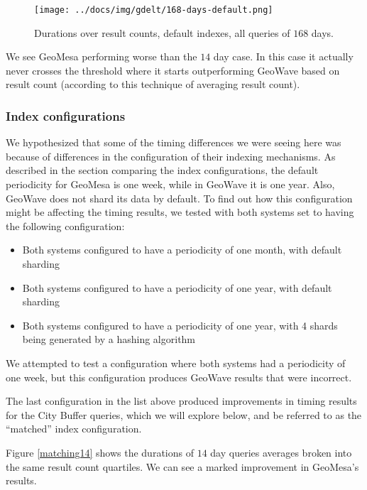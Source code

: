 \begin{figure}[h!tb]
  \centering
  \texttt{[image: ../docs/img/gdelt/168-days-default.png]}
  \caption{Durations over result counts, default indexes, all queries of $168$ days.}
  \label{durationresultall168}
\end{figure}

We see GeoMesa performing worse than the $14$ day case.
In this case it actually never crosses the threshold where it starts outperforming GeoWave based on result count
(according to this technique of averaging result count).

\subsubsection{Index configurations}

We hypothesized that some of the timing differences we were seeing here was because of differences in the configuration
of their indexing mechanisms. As described in the section comparing the index configurations, the default periodicity
for GeoMesa is one week, while in GeoWave it is one year. Also, GeoWave does not shard its data by default.
To find out how this configuration might be affecting the timing results, we tested with both systems set
to having the following configuration:

\begin{itemize}
\item Both systems configured to have a periodicity of one month, with default sharding
\item Both systems configured to have a periodicity of one year, with default sharding
\item Both systems configured to have a periodicity of one year, with 4 shards being generated by a hashing algorithm
\end{itemize}

We attempted to test a configuration where both systems had a periodicity of one week, but this configuration
produces GeoWave results that were incorrect.

The last configuration in the list above produced improvements in timing results for the City Buffer queries, which we will explore below,
and be referred to as the ``matched'' index configuration.

Figure \ref{matching14} shows the durations of $14$ day queries averages broken into the same result count quartiles.
We can see a marked improvement in GeoMesa's results.

